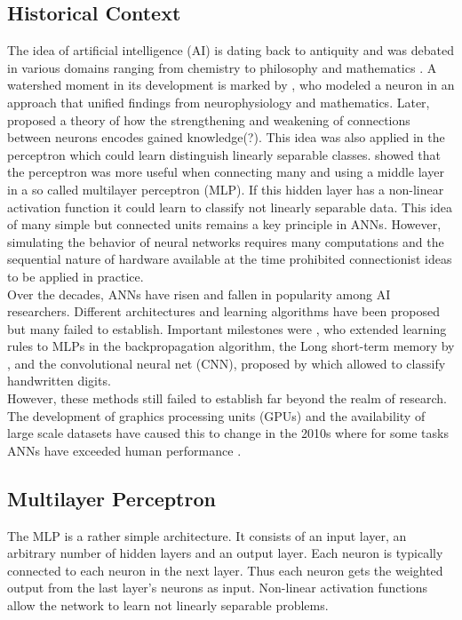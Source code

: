 \documentclass[a4paper,cleardoubleempty,BCOR1cm, 11pt]{report}
\begin{document}
\subsection{Historical Context}
The idea of artificial intelligence (AI) is dating back to antiquity and was debated in various domains ranging from chemistry \cite{o1994alchemical} to philosophy and mathematics \cite{leibnizdissertatio}. A watershed moment in its development is marked by \citet{mcculloch1943logical}, who modeled a neuron in an approach that unified findings from neurophysiology and mathematics. Later, \citet{hebb19680} proposed a theory of how the strengthening and weakening of connections between neurons encodes gained knowledge(?).  This idea was also applied in the perceptron \cite{rosenblatt1960perceptron} which could learn distinguish linearly separable classes. 
\citet{marvin1969perceptrons} showed that the perceptron was more useful when connecting many and using a middle layer in a so called multilayer perceptron (MLP). If this hidden layer has a non-linear activation function it could learn to classify not linearly separable data. This idea of many simple but connected units remains a key principle in ANNs.
However, simulating the behavior of neural networks requires many computations and the sequential nature of hardware available at the time prohibited connectionist ideas to be applied in practice.\\
Over the decades, ANNs have risen and fallen in popularity among AI researchers. Different architectures and learning algorithms have been proposed but many failed to establish. Important milestones were \citet{rumelhart1986learning}, who extended learning rules to MLPs in the backpropagation algorithm, the Long short-term memory by \citet{hochreiter1997long}, and the convolutional neural net (CNN), proposed by \citet{lecun1995convolutional} which allowed to classify handwritten digits.\\
However, these methods still failed to establish far beyond the realm of research. The development of graphics processing units (GPUs) and the availability of large scale datasets have caused this to change in the 2010s where for some tasks ANNs have exceeded human performance \cite{ILSVRC15}.


\subsection{Multilayer Perceptron}
The MLP is a rather simple architecture. It consists of an input layer, an arbitrary number of hidden layers and an output layer. Each neuron is typically connected to each neuron in the next layer. Thus each neuron gets the weighted output from the last layer's neurons as input. Non-linear activation functions allow the network to learn not linearly separable problems. 
\end{document}
